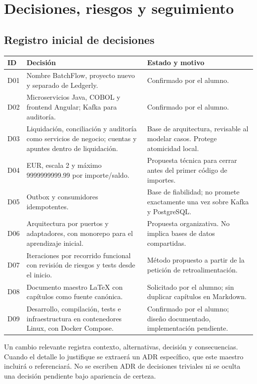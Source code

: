 \chapter{Decisiones, riesgos y seguimiento}
\section{Registro inicial de decisiones}
\begin{longtable}{L{0.10\textwidth}L{0.47\textwidth}L{0.32\textwidth}}
\textbf{ID} & \textbf{Decisión} & \textbf{Estado y motivo}\\\hline
D01 & Nombre BatchFlow, proyecto nuevo y separado de Ledgerly. & Confirmado por el alumno.\\
D02 & Microservicios Java, COBOL y frontend Angular; Kafka para auditoría. & Confirmado por el alumno.\\
D03 & Liquidación, conciliación y auditoría como servicios de negocio; cuentas y apuntes dentro de liquidación. & Base de arquitectura, revisable al modelar casos. Protege atomicidad local.\\
D04 & EUR, escala 2 y máximo 9999999999.99 por importe/saldo. & Propuesta técnica para cerrar antes del primer código de importes.\\
D05 & Outbox y consumidores idempotentes. & Base de fiabilidad; no promete exactamente una vez sobre Kafka y PostgreSQL.\\
D06 & Arquitectura por puertos y adaptadores, con monorepo para el aprendizaje inicial. & Propuesta organizativa. No implica bases de datos compartidas.\\
D07 & Iteraciones por recorrido funcional con revisión de riesgos y tests desde el inicio. & Método propuesto a partir de la petición de retroalimentación.\\
D08 & Documento maestro LaTeX con capítulos como fuente canónica. & Solicitado por el alumno; sin duplicar capítulos en Markdown.\\
D09 & Desarrollo, compilación, tests e infraestructura en contenedores Linux, con Docker Compose. & Confirmado por el alumno; diseño documentado, implementación pendiente.\\
\end{longtable}

Un cambio relevante registra contexto, alternativas, decisión y consecuencias. Cuando el detalle lo justifique se extraerá un ADR específico, que este maestro incluirá o referenciará. No se escriben ADR de decisiones triviales ni se oculta una decisión pendiente bajo apariencia de certeza.


